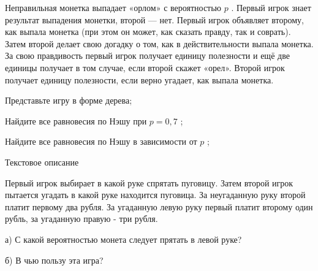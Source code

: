 \begin{problem}
 Неправильная монетка выпадает «орлом» с вероятностью  $p$ . Первый игрок знает результат выпадения монетки, второй — нет. Первый игрок объявляет второму, как выпала монетка (при этом он может, как сказать правду, так и соврать). Затем второй делает свою догадку о том, как в действительности выпала монетка. За свою правдивость первый игрок получает единицу полезности и ещё две единицы получает в том случае, если второй скажет «орел». Второй игрок получает единицу полезности, если верно угадает, как выпала монетка.\par
Представьте игру в форме дерева;\par
Найдите все равновесия по Нэшу при  $p=0,7$ ;\par
Найдите все равновесия по Нэшу в зависимости от  $p$ ;



\begin{sol}

\end{sol}
\end{problem}




\begin{problem}
 Текстовое описание \par
Первый игрок выбирает в какой руке спрятать пуговицу. Затем второй
игрок пытается угадать в какой руке находится пуговица. За
неугаданную руку второй платит первому два рубля. За угаданную
левую руку первый платит второму один рубль, за угаданную правую -
три рубля. \par
а) С какой вероятностью монета следует прятать в левой руке? \par
б) В чью пользу эта игра? \par



\begin{sol}

\end{sol}
\end{problem}




